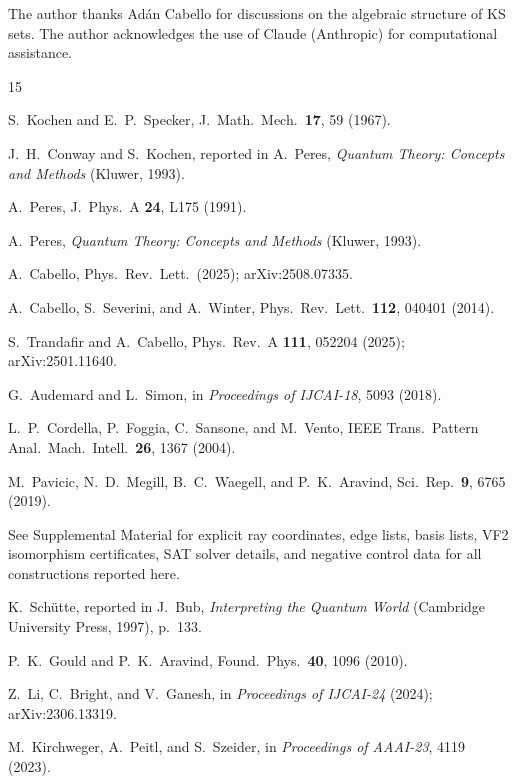 \documentclass[twocolumn,prl,superscriptaddress,nofootinbib]{revtex4-2}
\begin{document}
\begin{acknowledgments}
The author thanks Ad\'an Cabello for discussions on the algebraic structure of KS sets. The author acknowledges the use of Claude (Anthropic) for computational assistance.
\end{acknowledgments}

\begin{thebibliography}{15}

S.~Kochen and E.~P.~Specker,
J.\ Math.\ Mech.\ \textbf{17}, 59 (1967).

J.~H.~Conway and S.~Kochen,
reported in A.~Peres, \textit{Quantum Theory: Concepts and Methods} (Kluwer, 1993).

A.~Peres,
J.\ Phys.\ A \textbf{24}, L175 (1991).

A.~Peres,
\textit{Quantum Theory: Concepts and Methods} (Kluwer, 1993).

A.~Cabello,
Phys.\ Rev.\ Lett.\ (2025); arXiv:2508.07335.

A.~Cabello, S.~Severini, and A.~Winter,
Phys.\ Rev.\ Lett.\ \textbf{112}, 040401 (2014).

S.~Trandafir and A.~Cabello,
Phys.\ Rev.\ A \textbf{111}, 052204 (2025); arXiv:2501.11640.

G.~Audemard and L.~Simon,
in \textit{Proceedings of IJCAI-18}, 5093 (2018).

L.~P.~Cordella, P.~Foggia, C.~Sansone, and M.~Vento,
IEEE Trans.\ Pattern Anal.\ Mach.\ Intell.\ \textbf{26}, 1367 (2004).

M.~Pavicic, N.~D.~Megill, B.~C.~Waegell, and P.~K.~Aravind,
Sci.\ Rep.\ \textbf{9}, 6765 (2019).

See Supplemental Material for explicit ray coordinates, edge lists, basis lists, VF2 isomorphism certificates, SAT solver details, and negative control data for all constructions reported here.

K.~Sch\"utte,
reported in J.~Bub, \textit{Interpreting the Quantum World} (Cambridge University Press, 1997), p.~133.

P.~K.~Gould and P.~K.~Aravind,
Found.\ Phys.\ \textbf{40}, 1096 (2010).

Z.~Li, C.~Bright, and V.~Ganesh,
in \textit{Proceedings of IJCAI-24} (2024); arXiv:2306.13319.

M.~Kirchweger, A.~Peitl, and S.~Szeider,
in \textit{Proceedings of AAAI-23}, 4119 (2023).

\end{thebibliography}
\end{document}
